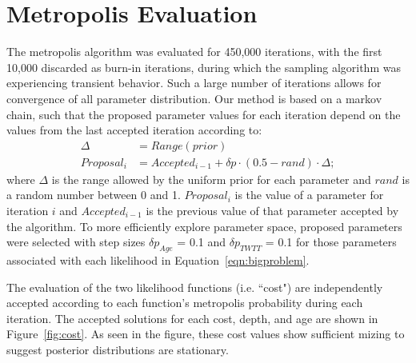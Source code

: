 \renewcommand{\thepage}{S\arabic{page}}  
\renewcommand{\thesection}{S\arabic{section}}   
\renewcommand{\thetable}{S\arabic{table}}   
\renewcommand{\thefigure}{S\arabic{figure}}
\setcounter{figure}{0}

\section{Metropolis Evaluation}

The metropolis algorithm was evaluated for 450,000 iterations, with the first 10,000 discarded as burn-in iterations, during which the sampling algorithm was experiencing transient behavior. Such a large number of iterations allows for convergence of all parameter distribution. Our method is based on a markov chain, such that the proposed parameter values for each iteration depend on the values from the last accepted iteration according to:
\begin{equation}\label{eqn:proposal}
\begin{split}
\Delta&=Range(prior) \\
Proposal_i&=Accepted_{i-1} + \delta p \cdot (0.5-rand) \cdot \Delta; 
\end{split}\tag{S1}
\end{equation}
where $\Delta$ is the range allowed by the uniform prior for each parameter and $rand$ is a random number between 0 and 1. $Proposal_i$ is the value of a parameter for iteration $i$ and $Accepted_{i-1}$ is the previous value of that parameter accepted by the algorithm. To more efficiently explore parameter space, proposed parameters were selected with step sizes $\delta p_{Age}$ = 0.1 and $\delta p_{TWTT}$ = 0.1 for those parameters associated with each likelihood in Equation~\ref{eqn:bigproblem}.

The evaluation of the two likelihood functions (i.e. ``cost") are independently accepted according to each function's metropolis probability during each iteration. The accepted solutions for each cost, depth, and age are shown in Figure~\ref{fig:cost}. As seen in the figure, these cost values show sufficient mizing to suggest posterior distributions are stationary.

